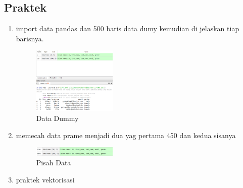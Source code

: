     \subsection{Praktek}
    \begin{enumerate}
        \item import data pandas dan 500 baris data dumy kemudian di jelaskan tiap barisnya. \hfill \break 
        
        \begin{figure}[H]
            \includegraphics[width=4cm]{figures/1174086/chapter4/1.png}
            \centering
            \caption{Data Dummy}
        \end{figure}

        \item memecah data prame menjadi dua yag pertama 450 dan kedua sisanya \hfill \break 
        
        \begin{figure}[H]
            \includegraphics[width=4cm]{figures/1174086/chapter4/2.png}
            \centering
            \caption{Pisah Data}
        \end{figure}

        \item praktek vektorisasi \hfill \break 
        

\end{enumerate}
